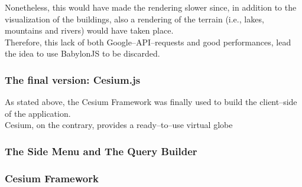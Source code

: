 Nonetheless, this would have made the rendering slower since, in addition to the visualization of the buildings, also a rendering of the terrain (i.e., lakes, mountains and rivers) would have taken place.\\
Therefore, this lack of both Google--API--requests and good performances, lead the idea to use BabylonJS to be discarded.
\subsubsection{The final version: Cesium.js}
As stated above, the Cesium Framework was finally used to build the client--side of the application.\\
Cesium, on the contrary, provides a ready--to--use virtual globe
\subsubsection{The Side Menu and The Query Builder}
\subsubsection{Cesium Framework}